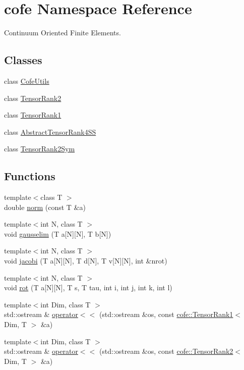 \hypertarget{namespacecofe}{\section{cofe Namespace Reference}
\label{namespacecofe}
}


Continuum Oriented Finite Elements.  


\subsection*{Classes}
\begin{DoxyCompactItemize}
\item 
class \hyperlink{classcofe_1_1CofeUtils}{Cofe\-Utils}
\item 
class \hyperlink{classcofe_1_1TensorRank2}{Tensor\-Rank2}
\item 
class \hyperlink{classcofe_1_1TensorRank1}{Tensor\-Rank1}
\item 
class \hyperlink{classcofe_1_1AbstractTensorRank4SS}{Abstract\-Tensor\-Rank4\-S\-S}
\item 
class \hyperlink{classcofe_1_1TensorRank2Sym}{Tensor\-Rank2\-Sym}
\end{DoxyCompactItemize}
\subsection*{Functions}
\begin{DoxyCompactItemize}
\item 
{\footnotesize template$<$class T $>$ }\\double \hyperlink{namespacecofe_a0e56d8696cb0405dc99575cedd504e1b}{norm} (const T \&a)
\item 
{\footnotesize template$<$int N, class T $>$ }\\void \hyperlink{namespacecofe_a5d5b0de16aea3255de1d90d382190948}{gausselim} (T a\mbox{[}N\mbox{]}\mbox{[}N\mbox{]}, T b\mbox{[}N\mbox{]})
\item 
{\footnotesize template$<$int N, class T $>$ }\\void \hyperlink{namespacecofe_afaaf31804fece6c0f775b00617b06d3c}{jacobi} (T a\mbox{[}N\mbox{]}\mbox{[}N\mbox{]}, T d\mbox{[}N\mbox{]}, T v\mbox{[}N\mbox{]}\mbox{[}N\mbox{]}, int \&nrot)
\item 
{\footnotesize template$<$int N, class T $>$ }\\void \hyperlink{namespacecofe_a478fccba3e4f3ac5306de274a92fc35c}{rot} (T a\mbox{[}N\mbox{]}\mbox{[}N\mbox{]}, T s, T tau, int i, int j, int k, int l)
\item 
{\footnotesize template$<$int Dim, class T $>$ }\\std\-::ostream \& \hyperlink{namespacecofe_ab6bccc99cdd1fd8eed53cd333f1f864f}{operator$<$$<$} (std\-::ostream \&os, const \hyperlink{classcofe_1_1TensorRank1}{cofe\-::\-Tensor\-Rank1}$<$ Dim, T $>$ \&a)
\item 
{\footnotesize template$<$int Dim, class T $>$ }\\std\-::ostream \& \hyperlink{namespacecofe_a232b6c35445601838612838ee6b7e8d2}{operator$<$$<$} (std\-::ostream \&os, const \hyperlink{classcofe_1_1TensorRank2}{cofe\-::\-Tensor\-Rank2}$<$ Dim, T $>$ \&a)
\end{DoxyCompactItemize}


